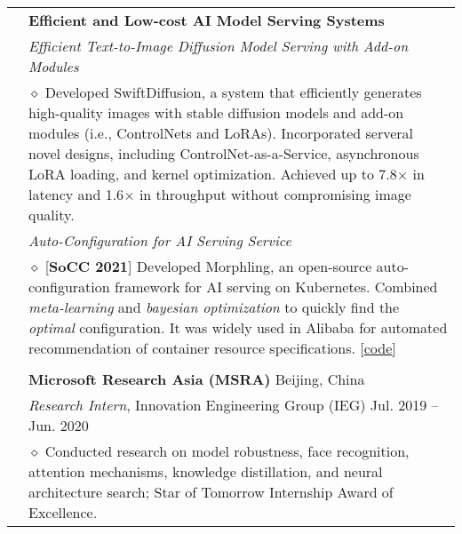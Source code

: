 \documentclass[letterpaper, 10pt]{article}
\begin{document}
\begin{longtable}{p{0.7in}p{6.0in}}
& \textbf{Efficient and Low-cost AI Model Serving Systems} \\
& \textit{\emph{Efficient Text-to-Image Diffusion Model Serving with Add-on Modules}} \\
    & $\diamond$
        Developed SwiftDiffusion, a system that efficiently generates high-quality images with stable diffusion models and add-on modules (i.e., ControlNets and LoRAs). Incorporated serveral novel designs, including ControlNet-as-a-Service, asynchronous LoRA loading, and kernel optimization. Achieved up to 7.8$\times$ in latency and 1.6$\times$ in throughput without compromising image quality.\\
& \textit{\emph{Auto-Configuration for AI Serving Service}} \\
    & $\diamond$
    [\textbf{SoCC 2021}]
    Developed Morphling, an open-source auto-configuration framework for AI serving on Kubernetes.
    Combined \textit{meta-learning} and \textit{bayesian optimization} to quickly find the \textit{optimal} configuration.
    It was widely used in Alibaba for automated recommendation of container resource specifications. [\href{https://github.com/kubedl-io/morphling}{\underline{code}}] \\
& \\

& {\textbf{Microsoft Research Asia (MSRA)}} \hfill Beijing, China\\
& \textit{Research Intern}, Innovation Engineering Group (IEG) \hfill Jul. 2019 -- Jun. 2020 \\
    & $\diamond$ Conducted research on model robustness, face recognition, attention mechanisms, knowledge distillation, and neural architecture search; Star of Tomorrow Internship Award of Excellence. \\


\end{longtable}
\end{document}

